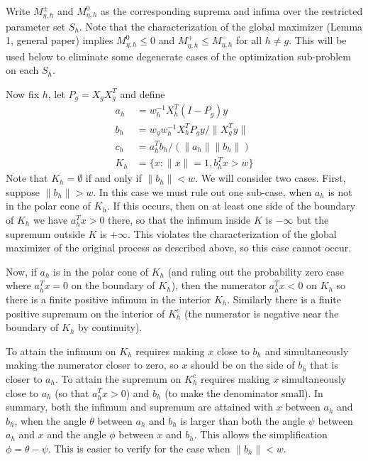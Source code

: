 \documentclass{imsart}
\newcommand{\norm}[1]{\lVert #1 \rVert}
\begin{document}
Write $M^{\pm}_{\eta, h}$ and $M^0_{\eta, h}$ as the corresponding suprema and infima over the restricted parameter set $S_h$. Note that the characterization of the global maximizer (Lemma 1, general paper) implies $M^0_{\eta, h} \leq 0$ and $M^+_{\eta, h} \leq M^-_{\eta, h}$ for all $h \neq g$. This will be used below to eliminate some degenerate cases of the optimization sub-problem on each $S_h$.

Now fix $h$, let $P_g = X_gX_g^T$ and define
\begin{align*}
a_h &= w_h^{-1} X_h^T (I-P_g) y \\
b_h &= w_g w_h^{-1} X_h^T P_g y / \norm{X_g^T y} \\
c_h &= a_h^T b_h / (\norm{a_h} \norm{b_h}) \\
K_h   &= \{ x : \norm{x} = 1, b_h^Tx > w \}
\end{align*}
Note that $K_h = \emptyset$ if and only if $\norm{b_h} < w$. We will consider two cases. First, suppose $\norm{b_h} > w$. In this case we must rule out one sub-case, when $a_h$ is not in the polar cone of $K_h$. If this occurs, then on at least one side of the boundary of $K_h$ we have $a_h^Tx > 0$ there, so that the infimum inside $K$ is $-\infty$ but the supremum outside $K$ is $+\infty$. This violates the characterization of the global maximizer of the original process as described above, so this case cannot occur.

Now, if $a_h$ is in the polar cone of $K_h$ (and ruling out the probability zero case where $a_h^Tx = 0$ on the boundary of $K_h$), then the numerator $a_h^Tx < 0$ on $K_h$ so there is a finite positive infimum in the interior $K_h$. Similarly there is a finite positive supremum on the interior of $K_h^c$ (the numerator is negative near the boundary of $K_h$ by continuity).

To attain the infimum on $K_h$ requires making $x$ close to $b_h$ and simultaneously making the numerator closer to zero, so $x$ should be on the side of $b_h$ that is closer to $a_h$. To attain the supremum on $K_h^c$ requires making $x$ simultaneously close to $a_h$ (so that $a_h^Tx > 0$) and $b_h$ (to make the denominator small). In summary, both the infimum and supremum are attained with $x$ between $a_h$ and $b_h$, when the angle $\theta$ between $a_h$ and $b_h$ is larger than both the angle $\psi$ between $a_h$ and $x$ and the angle $\phi$ between $x$ and $b_h$. This allows the simplification $\phi = \theta - \psi$. This is easier to verify for the case when $\norm{b_h} < w$.
\end{document}
